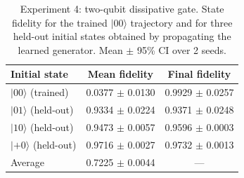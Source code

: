 \begin{table}[ht]
\centering
\caption{Experiment 4: two-qubit dissipative gate. State fidelity for the trained $\lvert 00\rangle$ trajectory and for three held-out initial states obtained by propagating the learned generator. Mean $\pm$ 95\% CI over 2 seeds.}
\label{tab:exp4}
\begin{tabular}{lcc}
\toprule
Initial state & Mean fidelity & Final fidelity \\
\midrule
$\lvert 00\rangle$ (trained) & 0.0377 $\pm$ 0.0130 & 0.9929 $\pm$ 0.0257 \\
$\lvert 01\rangle$ (held-out) & 0.9334 $\pm$ 0.0224 & 0.9371 $\pm$ 0.0248 \\
$\lvert 10\rangle$ (held-out) & 0.9473 $\pm$ 0.0057 & 0.9596 $\pm$ 0.0003 \\
$\lvert {+}0\rangle$ (held-out) & 0.9716 $\pm$ 0.0027 & 0.9732 $\pm$ 0.0013 \\
\midrule
Average & 0.7225 $\pm$ 0.0044 & --- \\
\bottomrule
\end{tabular}
\end{table}
